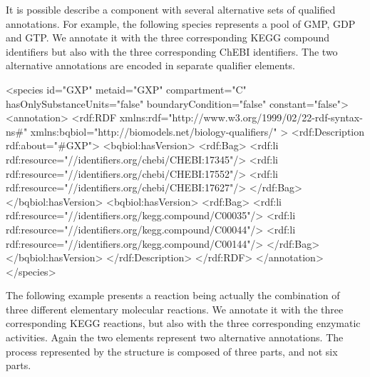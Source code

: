 It is possible describe a component with several alternative sets
of qualified annotations. For example, the following species
represents a pool of  GMP, GDP and GTP. We annotate it with the
three corresponding KEGG compound identifiers but also with the
three corresponding ChEBI identifiers.  The two alternative
annotations are encoded in separate  qualifier
elements.

\begin{example}
<species id="GXP" metaid="GXP" compartment="C"
         hasOnlySubstanceUnits="false" boundaryCondition="false"
         constant="false">
  <annotation>
    <rdf:RDF
      xmlns:rdf="http://www.w3.org/1999/02/22-rdf-syntax-ns\#"
      xmlns:bqbiol="http://biomodels.net/biology-qualifiers/"
    >
      <rdf:Description rdf:about="\#GXP">
        <bqbiol:hasVersion>
          <rdf:Bag>
            <rdf:li rdf:resource="//identifiers.org/chebi/CHEBI:17345\!"/>
            <rdf:li rdf:resource="//identifiers.org/chebi/CHEBI:17552\!"/>
            <rdf:li rdf:resource="//identifiers.org/chebi/CHEBI:17627\!"/>
          </rdf:Bag>
        </bqbiol:hasVersion>
        <bqbiol:hasVersion>
          <rdf:Bag>
            <rdf:li rdf:resource="//identifiers.org/kegg.compound/C00035\!"/>
            <rdf:li rdf:resource="//identifiers.org/kegg.compound/C00044\!"/>
            <rdf:li rdf:resource="//identifiers.org/kegg.compound/C00144\!"/>
          </rdf:Bag>
        </bqbiol:hasVersion>
      </rdf:Description>
    </rdf:RDF>
  </annotation>
</species>
\end{example}

The following example presents a reaction being actually the
combination of three different elementary molecular reactions. We
annotate it with the three corresponding KEGG reactions, but also
with the three corresponding enzymatic activities.  Again the two
 elements represent two alternative annotations.
The process represented by the \Reaction structure is
composed of three parts, and  not six parts.

